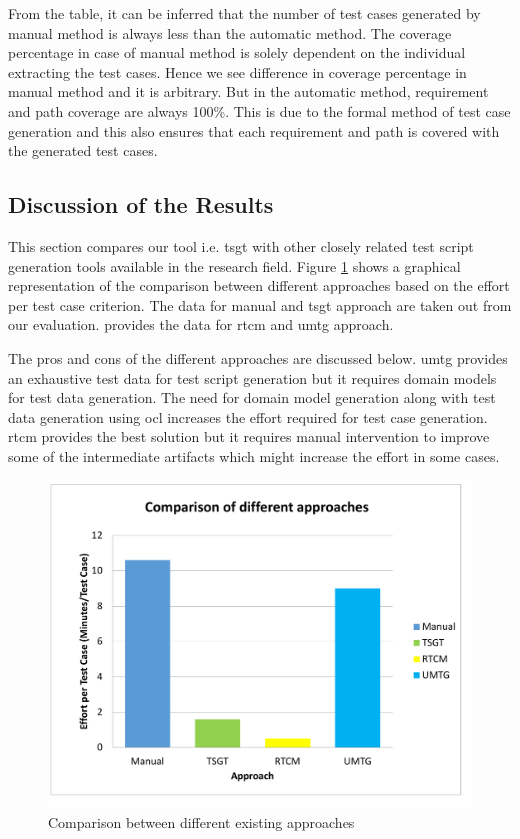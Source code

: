 From the table, it can be inferred that the number of test cases generated by manual method is always less than the automatic method. The coverage percentage in case of manual method is solely dependent on the individual extracting the test cases. Hence we see difference in coverage percentage in manual method and it is arbitrary. But in the automatic method, requirement and path coverage are always 100\%. This is due to the formal method of test case generation and this also ensures that each requirement and path is covered with the generated test cases. 

\subsection{Discussion of the Results}
This section compares our tool i.e. \gls{tsgt} with other closely related test script generation tools available in the research field. Figure \ref{fig:chap6fig3} shows a graphical representation of the comparison between different approaches based on the effort per test case criterion. The data for manual and \gls{tsgt} approach are taken out from our evaluation. \cite{yue2015rtcm}provides the data for \gls{rtcm} and \gls{umtg} approach.

The pros and cons of the different approaches are discussed below. \gls{umtg} provides an exhaustive test data for test script generation but it requires domain models for test data generation. The need for domain model generation along with test data generation using \gls{ocl} increases the effort required for test case generation. \gls{rtcm} provides the best solution but it requires manual intervention to improve some of the intermediate artifacts which might increase the effort in some cases. 

\begin{figure}[htb!]
\centering
\includegraphics[scale=0.45]{content/images/Chapter6/figure3.pdf}
\caption{Comparison between different existing approaches}
\label{fig:chap6fig3}
\end{figure}


